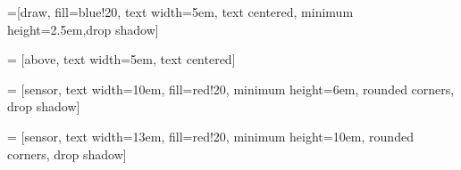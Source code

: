% 
% 
% 
% 

=[draw, fill=blue!20, text width=5em, 
    text centered, minimum height=2.5em,drop shadow]

 = [above, text width=5em, text centered]

 = [sensor, text width=10em, fill=red!20, 
    minimum height=6em, rounded corners, drop shadow]

 = [sensor, text width=13em, fill=red!20, 
    minimum height=10em, rounded corners, drop shadow]

\def\blockdist{2.3}
\def\edgedist{2.5}


